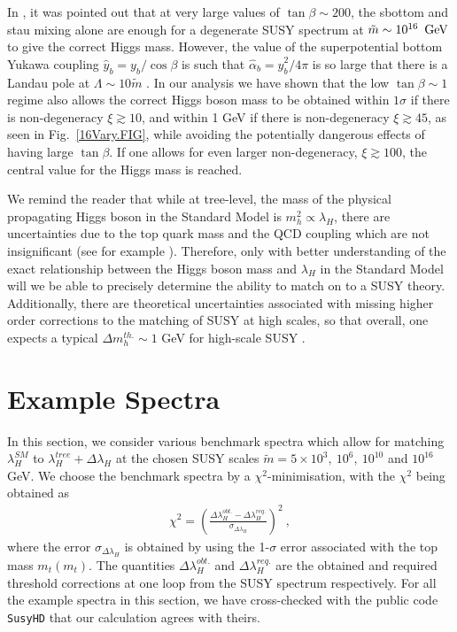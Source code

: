 \documentclass[12pt]{article}
\newcommand{\mS}{\tilde{m}}
\newcommand{\gev}{{\, {\rm GeV}}}
\begin{document}
In \cite{Vega:2015fna}, it was pointed out that at very large values of $\tan\beta \sim 200$, the sbottom and stau mixing alone are enough for a degenerate SUSY spectrum at $\mS \sim 10^{16}\ \gev$ to give the correct Higgs mass. However, the value of the superpotential bottom Yukawa coupling $\hat{y}_b = y_b /  \cos\beta$ is such that $\hat{\alpha}_b = \hat{y}_b^2 / 4\pi$ is so large that there is a Landau pole at $\Lambda \sim 10 \mS$ \cite{Vega:2015fna}. In our analysis we have shown that the low $\tan\beta \sim 1$ regime also allows the correct Higgs boson mass to be obtained within $1\sigma$ if there is non-degeneracy $\xi \gtrsim10$, and within 1 GeV if there is non-degeneracy $\xi \gtrsim 45$, as seen in Fig.\ \ref{16Vary.FIG}, while avoiding the potentially dangerous effects of having  large $\tan\beta$. If one allows for even larger non-degeneracy, $\xi \gtrsim 100$, the central value for the Higgs mass is reached.

We remind the reader that while at tree-level, the mass of the physical propagating Higgs boson in the Standard Model is $m_h^2 \propto \lambda_H$, there are uncertainties due to the top quark mass and the QCD coupling which are not insignificant (see for example \cite{Buttazzo:2013uya, Martin:2014cxa}). Therefore, only with better understanding of the exact relationship between the Higgs boson mass and $\lambda_H$ in the Standard Model will we be able to precisely determine the ability to match on to a SUSY theory. Additionally, there are theoretical uncertainties associated with missing higher order corrections to the matching of SUSY at high scales, so that overall, one expects a typical $\Delta m_h^{th.} \sim 1$ GeV for high-scale SUSY \cite{Vega:2015fna}.



\section{Example Spectra}
\label{Examples.SEC}
\bigskip

In this section, we consider various benchmark spectra which allow for matching $\lambda_H^{SM}$ to $\lambda_H^{tree}+\Delta\lambda_H$ at the chosen SUSY scales $\mS= 5\times10^3,~10^6,~10^{10}$ and $10^{16}$ GeV. We choose the benchmark spectra by a $\chi^2$-minimisation, with the $\chi^2$ being obtained as
\begin{align}
\chi^2 =\left( \frac{\Delta\lambda_H^{obt.} - \Delta\lambda_H^{req.}}{\sigma_{\Delta\lambda_H}}\right)^2 \ ,
\label{chiSq.EQ}
\end{align}
where the error $\sigma_{\Delta\lambda_H}$ is obtained by using the 1-$\sigma$ error associated with the top mass $m_t(m_t)$. The quantities $\Delta\lambda_H^{obt.}$ and $\Delta\lambda_H^{req.}$ are the obtained and required threshold corrections at one loop from the SUSY spectrum respectively. For all the example spectra in this section, we have cross-checked with the public code \texttt{SusyHD} \cite{Vega:2015fna} that our calculation agrees with theirs.
\end{document}

